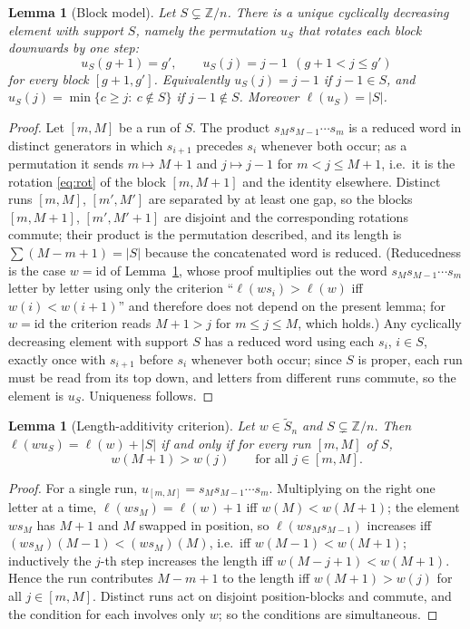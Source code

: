 \documentclass[11pt]{article}
\newtheorem{lem}[thm]{Lemma}
\theoremstyle{definition}
\newcommand{\Z}{\mathbb{Z}}
\newcommand{\Saff}{\widetilde{S}_{n}}
\begin{document}
\begin{lem}[Block model]\label{lem:blocks}
Let $S\subsetneq\Z/n$. There is a unique cyclically decreasing element with support $S$, namely
the permutation $u_S$ that rotates each block downwards by one step:
\begin{equation}\label{eq:rot}
  u_S(g+1)=g',\qquad u_S(j)=j-1\ \ (g+1<j\le g')
\end{equation}
for every block $[g+1,g']$. Equivalently $u_S(j)=j-1$ if $j-1\in S$, and
$u_S(j)=\min\{c\ge j:\ c\notin S\}$ if $j-1\notin S$. Moreover $\ell(u_S)=|S|$.
\end{lem}

\begin{proof}
Let $[m,M]$ be a run of $S$. The product $s_M s_{M-1}\cdots s_m$ is a reduced word in distinct
generators in which $s_{i+1}$ precedes $s_i$ whenever both occur; as a permutation it sends
$m\mapsto M+1$ and $j\mapsto j-1$ for $m<j\le M+1$, i.e.\ it is the rotation \eqref{eq:rot} of
the block $[m,M+1]$ and the identity elsewhere. Distinct runs $[m,M]$, $[m',M']$ are separated
by at least one gap, so the blocks $[m,M+1]$, $[m',M'+1]$ are disjoint and the corresponding
rotations commute; their product is the permutation described, and its length is $\sum(M-m+1)=|S|$
because the concatenated word is reduced. (Reducedness is the case $w=\mathrm{id}$ of
Lemma~\ref{lem:add}, whose proof multiplies out the word $s_Ms_{M-1}\cdots s_m$ letter by
letter using only the criterion ``$\ell(ws_i)>\ell(w)$ iff $w(i)<w(i+1)$'' and therefore does
not depend on the present lemma; for $w=\mathrm{id}$ the criterion reads $M+1>j$ for
$m\le j\le M$, which holds.) Any cyclically decreasing element with support $S$ has a reduced word using each
$s_i$, $i\in S$, exactly once with $s_{i+1}$ before $s_i$ whenever both occur; since $S$ is
proper, each run must be read from its top down, and letters from different runs commute, so the
element is $u_S$. Uniqueness follows.
\end{proof}

\begin{lem}[Length-additivity criterion]\label{lem:add}
Let $w\in\Saff$ and $S\subsetneq\Z/n$. Then $\ell(wu_S)=\ell(w)+|S|$ if and only if for every
run $[m,M]$ of $S$,
\[
  w(M+1)>w(j)\qquad\text{for all }j\in[m,M].
\]
\end{lem}

\begin{proof}
For a single run, $u_{[m,M]}=s_Ms_{M-1}\cdots s_m$. Multiplying on the right one letter at a
time, $\ell(ws_M)=\ell(w)+1$ iff $w(M)<w(M+1)$; the element $ws_M$ has $M+1$ and $M$ swapped in
position, so $\ell(ws_Ms_{M-1})$ increases iff $(ws_M)(M-1)<(ws_M)(M)$, i.e.\ iff
$w(M-1)<w(M+1)$; inductively the $j$-th step increases the length iff $w(M-j+1)<w(M+1)$.
Hence the run contributes $M-m+1$ to the length iff $w(M+1)>w(j)$ for all $j\in[m,M]$.
Distinct runs act on disjoint position-blocks and commute, and the condition for each involves
only $w$; so the conditions are simultaneous.
\end{proof}
\end{document}
